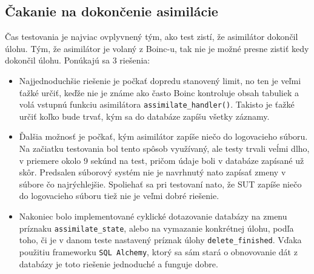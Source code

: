 \subsection*{Čakanie na dokončenie asimilácie}
Čas testovania je najviac ovplyvnený tým, ako test zistí, že asimilátor dokončil úlohu.
Tým, že asimilátor je volaný z Boinc-u, tak nie je možné presne zistiť kedy dokončil úlohu.
Ponúkajú sa 3 riešenia:
\begin{itemize}
	\item Najjednoduchšie riešenie je počkať dopredu stanovený limit, no ten je veľmi ťažké určiť, keďže nie je známe ako často Boinc kontroluje obsah tabuliek a volá vstupnú funkciu asimilátora \texttt{assimilate\_handler()}.
		Takisto je ťažké určiť koľko bude trvať, kým sa do databáze zapíšu všetky záznamy.

	\item Ďalšia možnosť je počkať, kým asimilátor zapíše niečo do logovacieho súboru.
		Na začiatku testovania bol tento spôsob využívaný, ale testy trvali veĺmi dlho, v priemere okolo 9 sekúnd na test, pričom údaje boli v databáze zapísané už skôr.
		Predsalen súborový systém nie je navrhnutý nato zapísať zmeny v súbore čo najrýchlejšie.
		Spoliehať sa pri testovaní nato, že SUT zapíše niečo do logovacieho súboru tiež nie je veľmi dobré riešenie.

		\sloppy
	\item Nakoniec bolo implementované cyklické dotazovanie databázy na zmenu príznaku \texttt{assimilate\_state}, alebo na vymazanie konkrétnej úlohu, podľa toho, či je v danom teste nastavený príznak úlohy \texttt{delete\_finished}.
		Vďaka použitiu frameworku \texttt{SQL Alchemy}, ktorý sa sám stará o obnovovanie dát z databázy je toto riešenie jednoduché a funguje dobre.
\end{itemize}

